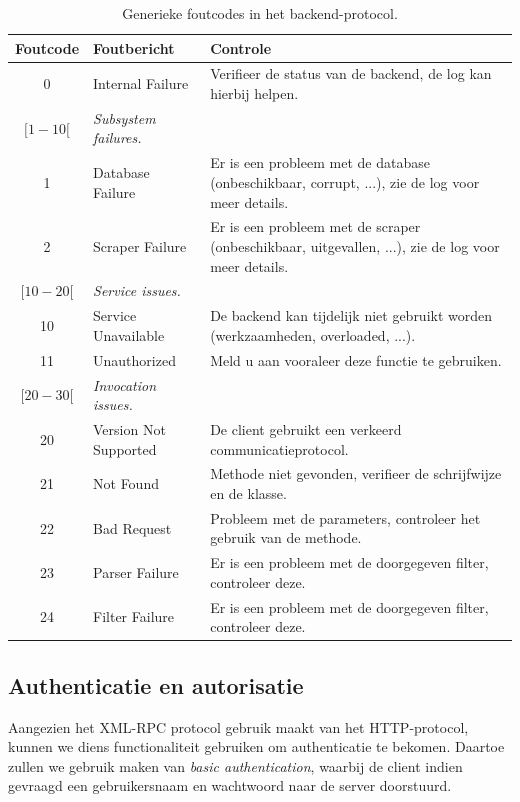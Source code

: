 \begin{table}
\begin{tabular}{| c p{5cm} p{7cm} |}
	\hline
	Foutcode & Foutbericht & Controle \\
	\hline
	
	0 & Internal Failure & Verifieer de status van de backend, de log kan hierbij helpen. \\
	\hline
	
	$[1-10[$ & \emph{Subsystem failures.} & \\
	1 & Database Failure & Er is een probleem met de database (onbeschikbaar, corrupt, ...), zie de log voor meer details. \\
	2 & Scraper Failure & Er is een probleem met de scraper (onbeschikbaar, uitgevallen, ...), zie de log voor meer details. \\
	\hline
	
	$[10-20[$ & \emph{Service issues.} & \\
	10 & Service Unavailable & De backend kan tijdelijk niet gebruikt worden (werkzaamheden, overloaded, ...). \\
	11 & Unauthorized & Meld u aan vooraleer deze functie te gebruiken. \\
	\hline
	
	$[20-30[$ & \emph{Invocation issues.} & \\
	20 & Version Not Supported & De client gebruikt een verkeerd communicatieprotocol. \\
	21 & Not Found & Methode niet gevonden, verifieer de schrijfwijze en de klasse. \\
	22 & Bad Request & Probleem met de parameters, controleer het gebruik van de methode. \\
	23 & Parser Failure & Er is een probleem met de doorgegeven filter, controleer deze. \\
	24 & Filter Failure & Er is een probleem met de doorgegeven filter, controleer deze. \\
	\hline
\end{tabular}
\caption{Generieke foutcodes in het backend-protocol.}
\end{table}

\subsection{Authenticatie en autorisatie}

Aangezien het XML-RPC protocol gebruik maakt van het HTTP-protocol, kunnen we diens functionaliteit gebruiken om authenticatie te bekomen. Daartoe zullen we gebruik maken van \emph{basic authentication}, waarbij de client indien gevraagd een gebruikersnaam en wachtwoord naar de server doorstuurd.

